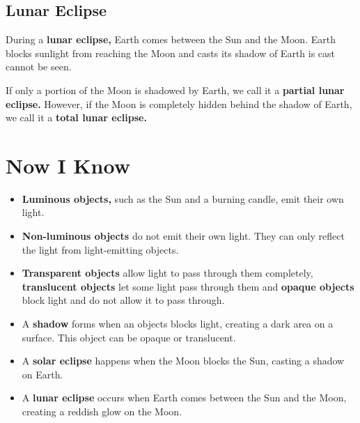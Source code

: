\subsection{Lunar Eclipse}
During a \textbf{lunar eclipse,} Earth comes between the Sun and the Moon. Earth blocks sunlight from reaching the Moon and casts its shadow of Earth is cast cannot be seen.
\vspace{0.1in}
\par
If only a portion of the Moon is shadowed by Earth, we call it a \textbf{partial lunar eclipse.} However, if the Moon is completely hidden behind the shadow of Earth, we call it a \textbf{total lunar eclipse.}
\vspace{2.8in}
\section{Now I Know}
\begin{itemize}
    \item \textbf{Luminous objects,} such as the Sun and a burning candle, emit their own light.
    \item \textbf{Non-luminous objects} do not emit their own light. They can only reflect the light from light-emitting objects.
    \item \textbf{Transparent objects} allow light to pass through them completely, \textbf{translucent objects} let some light pass through them and \textbf{opaque objects} block light and do not allow it to pass through.
    \item A \textbf{shadow} forms when an objects blocks light, creating a dark area on a surface. This object can be opaque or translucent.
    \item A \textbf{solar eclipse} happens when the Moon blocks the Sun, casting a shadow on Earth.
    \item A \textbf{lunar eclipse} occurs when Earth comes between the Sun and the Moon, creating a reddish glow on the Moon.
\end{itemize}